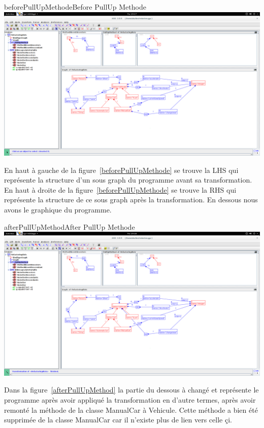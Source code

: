 \documentclass[a4paper, 12pt]{article}
\begin{document}
\begin{enumerate}
\begin{myfig}{beforePullUpMethode}{Before PullUp Methode}
\includegraphics[width=\textwidth]{beforePullUpMethode.png}
\end{myfig}

En haut à gauche de la figure~\ref{beforePullUpMethode} se trouve la LHS qui représente la structure d'un sous graph du programme avant sa transformation. 
En haut à droite de la figure~\ref{beforePullUpMethode} se trouve la RHS qui représente la structure de ce sous graph après la transformation.
En dessous nous avons le graphique du programme.

\begin{myfig}{afterPullUpMethod}{After PullUp Methode}
\includegraphics[width=\textwidth]{afterPullUpMethod.png}
\end{myfig}

Dans la figure~\ref{afterPullUpMethod} la partie du dessous à changé et représente le programme après avoir appliqué la transformation en d'autre termes, après avoir remonté la méthode de la classe ManualCar à Vehicule.
Cette méthode a bien été supprimée de la classe ManualCar car il n'existe plus de lien vers celle çi.



\end{enumerate}
\end{document}
